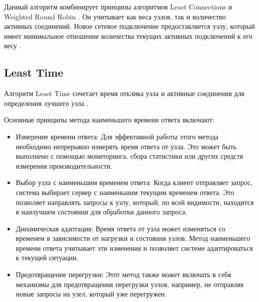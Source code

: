 Данный алгоритм комбинирует принципы алгоритмов Least Connections и Weighted Round Robin \cite{weightedroundrobin}. %
Он учитывает как веса узлов, так и количество активных соединений. 
Новое сетевое подключение предоставляется узлу, который имеет минимальное отношение количества текущих активных подключений к его весу \cite{mainsource}.


\subsection{Least Time}
Алгоритм Least Time сочетает время отклика узла и активные соединения для определения лучшего узла \cite{balance}. 

Основные принципы метода наименьшего времени ответа включают:

\begin{itemize}
	\item Измерение времени ответа: Для эффективной работы этого метода необходимо непрерывно измерять время ответа от узла. Это может быть выполнено с помощью мониторинга, сбора статистики или других средств измерения производительности.
	
	\item Выбор узла с наименьшим временем ответа: Когда клиент отправляет запрос, система выбирает сервер с наименьшим текущим временем ответа. Это позволяет направлять запросы к узлу, который, по всей видимости, находится в наилучшем состоянии для обработки данного запроса.
	
	\item Динамическая адаптация: Время ответа от узла может изменяться со временем в зависимости от нагрузки и состояния узлов. Метод наименьшего времени ответа учитывает эти изменения и позволяет системе адаптироваться к текущей ситуации.
	
	\item Предотвращение перегрузки: Этот метод также может включать в себя механизмы для предотвращения перегрузки узлов, например, не отправляя новые запросы на узел, который уже перегружен.
\end{itemize} 